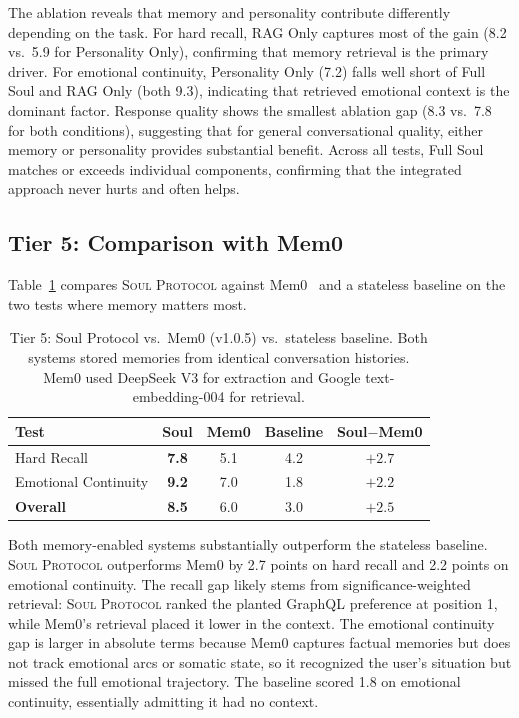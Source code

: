 \documentclass{article}
\newcommand{\soul}{\textsc{Soul Protocol}}
\begin{document}
The ablation reveals that memory and personality contribute differently depending on the task. For hard recall, RAG Only captures most of the gain (8.2 vs.\ 5.9 for Personality Only), confirming that memory retrieval is the primary driver. For emotional continuity, Personality Only (7.2) falls well short of Full Soul and RAG Only (both 9.3), indicating that retrieved emotional context is the dominant factor. Response quality shows the smallest ablation gap (8.3 vs.\ 7.8 for both conditions), suggesting that for general conversational quality, either memory or personality provides substantial benefit. Across all tests, Full Soul matches or exceeds individual components, confirming that the integrated approach never hurts and often helps.

\subsection{Tier 5: Comparison with Mem0}

Table~\ref{tab:mem0} compares \soul{} against Mem0~\cite{chhablani2025mem0} and a stateless baseline on the two tests where memory matters most.

\begin{table}[h]
\centering
\begin{tabular}{@{}lcccc@{}}
\toprule
\textbf{Test} & \textbf{Soul} & \textbf{Mem0} & \textbf{Baseline} & \textbf{Soul$-$Mem0} \\
\midrule
Hard Recall          & \textbf{7.8} & 5.1 & 4.2 & $+2.7$ \\
Emotional Continuity & \textbf{9.2} & 7.0 & 1.8 & $+2.2$ \\
\midrule
\textbf{Overall}     & \textbf{8.5} & 6.0 & 3.0 & $+2.5$ \\
\bottomrule
\end{tabular}
\caption{Tier 5: Soul Protocol vs.\ Mem0 (v1.0.5) vs.\ stateless baseline. Both systems stored memories from identical conversation histories. Mem0 used DeepSeek V3 for extraction and Google text-embedding-004 for retrieval.}
\label{tab:mem0}
\end{table}

Both memory-enabled systems substantially outperform the stateless baseline. \soul{} outperforms Mem0 by 2.7 points on hard recall and 2.2 points on emotional continuity. The recall gap likely stems from significance-weighted retrieval: \soul{} ranked the planted GraphQL preference at position 1, while Mem0's retrieval placed it lower in the context. The emotional continuity gap is larger in absolute terms because Mem0 captures factual memories but does not track emotional arcs or somatic state, so it recognized the user's situation but missed the full emotional trajectory. The baseline scored 1.8 on emotional continuity, essentially admitting it had no context.
\end{document}
